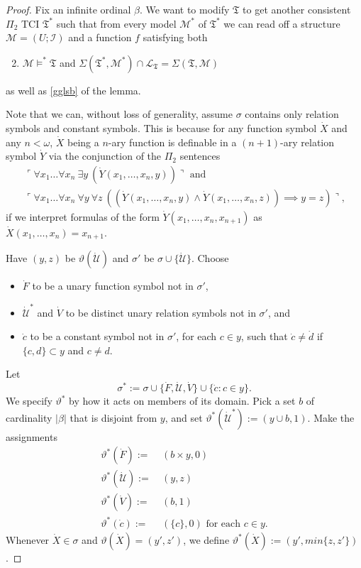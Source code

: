 \documentclass[12pt]{article}
\numberwithin{equation}{section}
\begin{document}
\begin{proof}
Fix an infinite ordinal $\beta$. We want to modify $\mathfrak{T}$ to get another consistent $\Pi_2$ TCI $\mathfrak{T}^*$ such that from every model $\mathcal{M}^*$ of $\mathfrak{T}^*$ we can read off a structure $\mathcal{M} = (U; \mathcal{I})$ and a function $f$ satisfying both
\begin{enumerate}[label=(\alph*)']
    \setcounter{enumi}{1}
    \item\label{gglsb'} $\mathcal{M} \models^* \mathfrak{T}$ and $\Sigma(\mathfrak{T}^*, \mathcal{M}^*) \cap \mathcal{L}_{\mathfrak{T}} = \Sigma(\mathfrak{T}, \mathcal{M})$
\end{enumerate}
as well as \ref{gglsb} of the lemma. 

Note that we can, without loss of generality, assume $\sigma$ contains only relation symbols and constant symbols. This is because for any function symbol $\dot{X}$ and any $n < \omega$, $\dot{X}$ being a $n$-ary function is definable in a $(n+1)$-ary relation symbol $\dot{Y}$ via the conjunction of the $\Pi_2$ sentences
\begin{gather*}
    \ulcorner \forall x_1 \dots \forall x_n \ \exists y \ (\dot{Y}(x_1, \dots, x_n, y)) \urcorner \text{ and} \\
    \ulcorner \forall x_1 \dots \forall x_n \ \forall y \ \forall z \ ((\dot{Y} (x_1, \dots, x_n, y) \wedge \dot{Y} (x_1, \dots, x_n, z)) \implies y = z) \urcorner \text{,} 
\end{gather*}
if we interpret formulas of the form $\dot{Y} (x_1, \dots, x_n, x_{n+1})$ as $\dot{X} (x_1, \dots, x_n) = x_{n+1}$.

Have $(y, z)$ be $\vartheta(\dot{\mathcal{U}})$ and $\sigma'$ be $\sigma \cup \{\dot{\mathcal{U}}\}$. Choose 
\begin{itemize}
    \item $\dot{F}$ to be a unary function symbol not in $\sigma'$,
    \item $\dot{\mathcal{U}}^*$ and $\dot{V}$ to be distinct unary relation symbols not in $\sigma'$, and
    \item $\dot{c}$ to be a constant symbol not in $\sigma'$, for each $c \in y$, such that $\dot{c} \neq \dot{d}$ if $\{c, d\} \subset y$ and $c \neq d$.
\end{itemize}
Let $$\sigma^* := \sigma \cup \{\dot{F}, \dot{\mathcal{U}}, \dot{V}\} \cup \{\dot{c} : c \in y\}.$$ We specify $\vartheta^*$ by how it acts on members of its domain. Pick a set $b$ of cardinality $|\beta|$ that is disjoint from $y$, and set $\vartheta^*(\dot{\mathcal{U}}^*) := (y \cup b, 1)$. Make the assignments
\begin{align*}
    \vartheta^*(\dot{F}) := \ & (b \times y, 0) \\
    \vartheta^*(\dot{\mathcal{U}}) := \ & (y, z) \\
    \vartheta^*(\dot{V}) := \ & (b, 1) \\
    \vartheta^*(\dot{c}) := \ & (\{c\}, 0) \text{ for each } c \in y \text{.}
\end{align*}
Whenever $\dot{X} \in \sigma$ and $\vartheta(\dot{X}) = (y', z')$, we define $\vartheta^*(\dot{X}) := (y', min\{z, z'\})$.


\end{proof}
\end{document}
